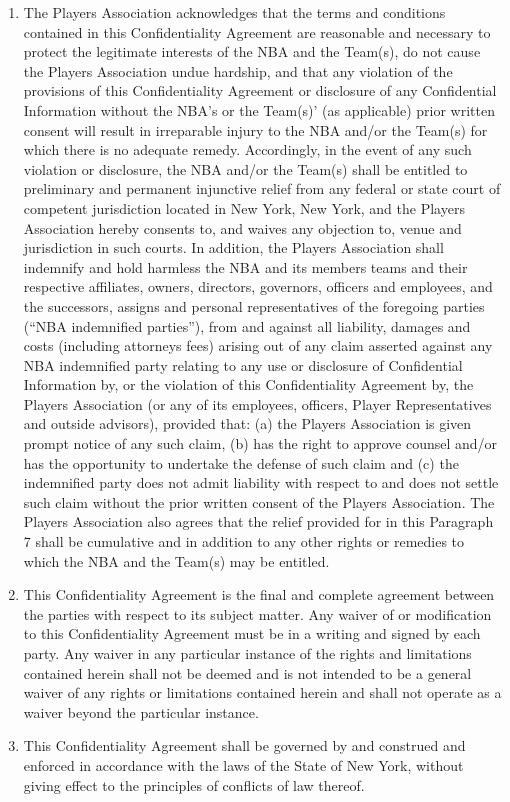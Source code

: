 \documentclass[
]{book}
\begin{document}
\begin{enumerate}
\item
  The Players Association acknowledges that the terms and conditions contained in this Confidentiality Agreement are reasonable and necessary to protect the legitimate interests of the NBA and the Team(s), do not cause the Players Association undue hardship, and that any violation of the provisions of this Confidentiality Agreement or disclosure of any Confidential Information without the NBA's or the Team(s)' (as applicable) prior written consent will result in irreparable injury to the NBA and/or the Team(s) for which there is no adequate remedy. Accordingly, in the event of any such violation or disclosure, the NBA and/or the Team(s) shall be entitled to preliminary and permanent injunctive relief from any federal or state court of competent jurisdiction located in New York, New York, and the Players Association hereby consents to, and waives any objection to, venue and jurisdiction in such courts. In addition, the Players Association shall indemnify and hold harmless the NBA and its members teams and their respective affiliates, owners, directors, governors, officers and employees, and the successors, assigns and personal representatives of the foregoing parties (``NBA indemnified parties''), from and against all liability, damages and costs (including attorneys fees) arising out of any claim asserted against any NBA indemnified party relating to any use or disclosure of Confidential Information by, or the violation of this Confidentiality Agreement by, the Players Association (or any of its employees, officers, Player Representatives and outside advisors), provided that: (a) the Players Association is given prompt notice of any such claim, (b) has the right to approve counsel and/or has the opportunity to undertake the defense of such claim and (c) the indemnified party does not admit liability with respect to and does not settle such claim without the prior written consent of the Players Association. The Players Association also agrees that the relief provided for in this Paragraph 7 shall be cumulative and in addition to any other rights or remedies to which the NBA and the Team(s) may be entitled.
\item
  This Confidentiality Agreement is the final and complete agreement between the parties with respect to its subject matter. Any waiver of or modification to this Confidentiality Agreement must be in a writing and signed by each party. Any waiver in any particular instance of the rights and limitations contained herein shall not be deemed and is not intended to be a general waiver of any rights or limitations contained herein and shall not operate as a waiver beyond the particular instance.
\item
  This Confidentiality Agreement shall be governed by and construed and enforced in accordance with the laws of the State of New York, without giving effect to the principles of conflicts of law thereof.
\end{enumerate}
\end{document}
